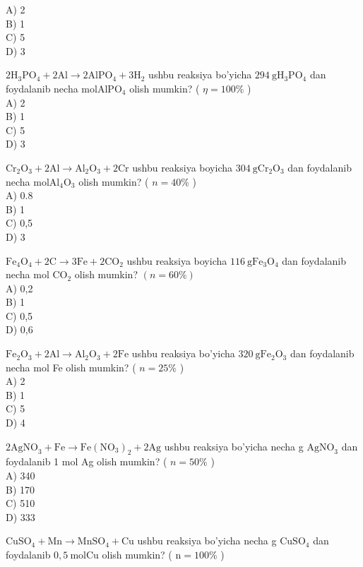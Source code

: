 A) 2\\
B) 1\\
C) 5\\
D) 3
  \item $2 \mathrm{H}_{3} \mathrm{PO}_{4}+2 \mathrm{Al} \rightarrow 2 \mathrm{AlPO}_{4}+3 \mathrm{H}_{2}$ ushbu reaksiya bo'yicha $294 \mathrm{~g} \mathrm{H}_{3} \mathrm{PO}_{4}$ dan foydalanib necha $\mathrm{mol} \mathrm{AlPO}_{4}$ olish mumkin? ( $\eta=100 \%$ )\\
A) 2\\
B) 1\\
C) 5\\
D) 3
  \item $\mathrm{Cr}_{2} \mathrm{O}_{3}+2 \mathrm{Al} \rightarrow \mathrm{Al}_{2} \mathrm{O}_{3}+2 \mathrm{Cr}$ ushbu reaksiya boyicha $304 \mathrm{~g} \mathrm{Cr}_{2} \mathrm{O}_{3}$ dan foydalanib necha $\mathrm{mol} \mathrm{Al}_{4} \mathrm{O}_{3}$ olish mumkin? ( $n=40 \%$ )\\
A) 0.8\\
B) 1\\
C) 0,5\\
D) 3
  \item $\mathrm{Fe}_{4} \mathrm{O}_{4}+2 \mathrm{C} \rightarrow 3 \mathrm{Fe}+2 \mathrm{CO}_{2}$ ushbu reaksiya boyicha $116 \mathrm{~g} \mathrm{Fe}_{3} \mathrm{O}_{4}$ dan foydalanib necha mol $\mathrm{CO}_{2}$ olish mumkin? $(n=60 \%)$\\
A) 0,2\\
B) 1\\
C) 0,5\\
D) 0,6
  \item $\mathrm{Fe}_{2} \mathrm{O}_{3}+2 \mathrm{Al} \rightarrow \mathrm{Al}_{2} \mathrm{O}_{3}+2 \mathrm{Fe}$ ushbu reaksiya bo'yicha $320 \mathrm{~g} \mathrm{Fe}_{2} \mathrm{O}_{3}$ dan foydalanib necha mol Fe olish mumkin? ( $n=25 \%$ )\\
A) 2\\
B) 1\\
C) 5\\
D) 4
  \item $2 \mathrm{AgNO}_{3}+\mathrm{Fe} \rightarrow \mathrm{Fe}\left(\mathrm{NO}_{3}\right)_{2}+2 \mathrm{Ag}$ ushbu reaksiya bo'yicha necha g $\mathrm{AgNO}_{3}$ dan foydalanib 1 mol Ag olish mumkin? ( $n=50 \%$ )\\
A) 340\\
B) 170\\
C) 510\\
D) 333
  \item $\mathrm{CuSO}_{4}+\mathrm{Mn} \rightarrow \mathrm{MnSO}_{4}+\mathrm{Cu}$ ushbu reaksiya bo'yicha necha g $\mathrm{CuSO}_{4}$ dan foydalanib $0,5 \mathrm{~mol} \mathrm{Cu}$ olish mumkin? ( $\mathrm{n}=100 \%$ )\\
